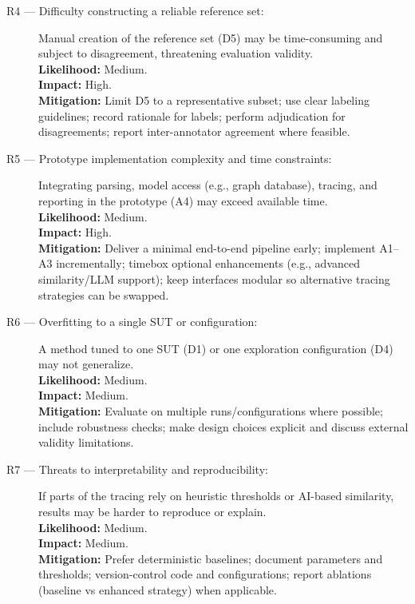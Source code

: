 \documentclass{ou-report-vaf}
\begin{document}
\begin{description}
    \item[R4 --- Difficulty constructing a reliable reference set:]
    Manual creation of the reference set (D5) may be time-consuming and subject to disagreement, threatening evaluation validity. \\
    \textbf{Likelihood:} Medium. \\
    \textbf{Impact:} High. \\
    \textbf{Mitigation:} Limit D5 to a representative subset; use clear labeling guidelines; record rationale for labels; perform adjudication for disagreements; report inter-annotator agreement where feasible.

    \item[R5 --- Prototype implementation complexity and time constraints:]
    Integrating parsing, model access (e.g., graph database), tracing, and reporting in the prototype (A4) may exceed available time. \\
    \textbf{Likelihood:} Medium. \\
    \textbf{Impact:} High. \\
    \textbf{Mitigation:} Deliver a minimal end-to-end pipeline early; implement A1--A3 incrementally; timebox optional enhancements (e.g., advanced similarity/LLM support); keep interfaces modular so alternative tracing strategies can be swapped.

    \item[R6 --- Overfitting to a single SUT or configuration:]
    A method tuned to one SUT (D1) or one exploration configuration (D4) may not generalize. \\
    \textbf{Likelihood:} Medium. \\
    \textbf{Impact:} Medium. \\
    \textbf{Mitigation:} Evaluate on multiple runs/configurations where possible; include robustness checks; make design choices explicit and discuss external validity limitations.

    \item[R7 --- Threats to interpretability and reproducibility:]
    If parts of the tracing rely on heuristic thresholds or AI-based similarity, results may be harder to reproduce or explain. \\
    \textbf{Likelihood:} Medium. \\
    \textbf{Impact:} Medium. \\
    \textbf{Mitigation:} Prefer deterministic baselines; document parameters and thresholds; version-control code and configurations; report ablations (baseline vs enhanced strategy) when applicable.
\end{description}

\clearpage


\end{document}
